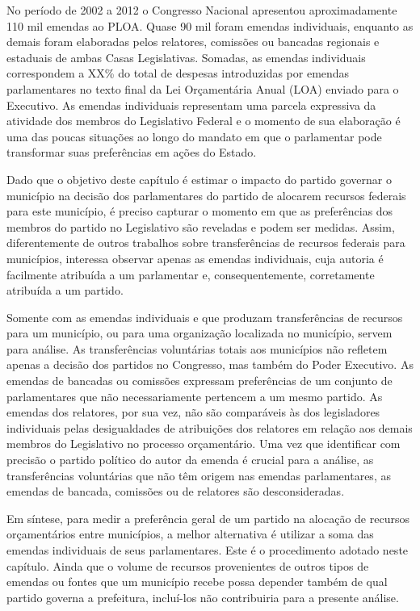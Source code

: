 No período de 2002 a 2012 o Congresso Nacional apresentou aproximadamente 110 mil emendas ao PLOA. Quase 90 mil foram emendas individuais, enquanto as demais foram elaboradas pelos relatores, comissões ou bancadas regionais e estaduais de ambas Casas Legislativas. Somadas, as emendas individuais correspondem a XX\% do total de despesas introduzidas por emendas parlamentares no texto final da Lei Orçamentária Anual (LOA) enviado para o Executivo. As emendas individuais representam uma parcela expressiva da atividade dos membros do Legislativo Federal e o momento de sua elaboração é uma das poucas situações ao longo do mandato em que o parlamentar pode transformar suas preferências em ações do Estado.

Dado que o objetivo deste capítulo é estimar o impacto do partido governar o município na decisão dos parlamentares do partido de alocarem recursos federais para este município, é preciso capturar o momento em que as preferências dos membros do partido no Legislativo são reveladas e podem ser medidas. Assim, diferentemente de outros trabalhos sobre transferências de recursos federais para municípios, interessa observar apenas as emendas individuais, cuja autoria é facilmente atribuída a um parlamentar e, consequentemente, corretamente atribuída a um partido.

Somente com as emendas individuais e que produzam transferências de recursos para um município, ou para uma organização localizada no município, servem para análise. As transferências voluntárias totais aos municípios não refletem apenas a decisão dos partidos no Congresso, mas também do Poder Executivo. As emendas de bancadas ou comissões expressam preferências de um conjunto de parlamentares que não necessariamente pertencem a um mesmo partido. As emendas dos relatores, por sua vez, não são comparáveis às dos legisladores individuais pelas desigualdades de atribuições dos relatores em relação aos demais membros do Legislativo no processo orçamentário. Uma vez que identificar com precisão o partido político do autor da emenda é crucial para a análise, as transferências voluntárias que não têm origem nas emendas parlamentares, as emendas de bancada, comissões ou de relatores são desconsideradas. 

Em síntese, para medir a preferência geral de um partido na alocação de recursos orçamentários entre municípios, a melhor alternativa é utilizar a soma das emendas individuais de seus parlamentares. Este é o procedimento adotado neste capítulo. Ainda que o volume de recursos provenientes de outros tipos de emendas ou fontes que um município recebe possa depender também de qual partido governa a prefeitura, incluí-los não contribuiria para a presente análise.

